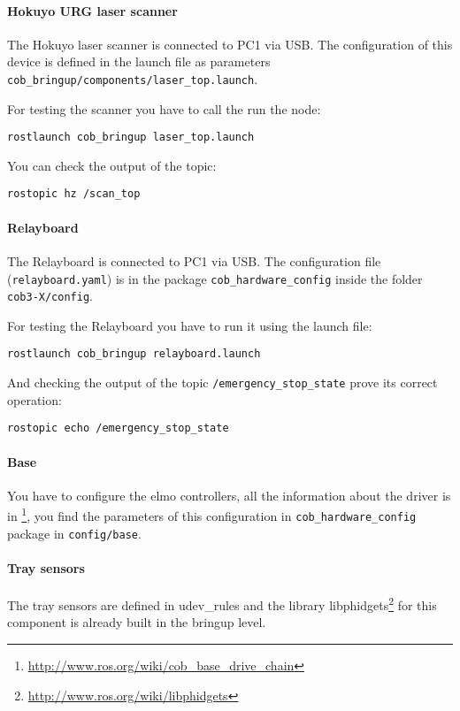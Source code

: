 \paragraph{Hokuyo URG laser scanner}
The Hokuyo laser scanner is connected to PC1 via USB. The configuration of this device is defined in the launch file as parameters \texttt{cob\_bringup/components/laser\_top.launch}.

For testing the scanner you have to call the run the node:
\begin{lstlisting}
rostlaunch cob_bringup laser_top.launch
\end{lstlisting}

You can check the output of the topic:
\begin{lstlisting}
rostopic hz /scan_top
\end{lstlisting}

\paragraph{Relayboard}
The Relayboard is connected to PC1 via USB. The configuration file (\texttt{relayboard.yaml}) is in the package \texttt{cob\_hardware\_config} inside the folder \texttt{cob3-X/config}.

For testing the Relayboard you have to run it using the launch file:
\begin{lstlisting}
rostlaunch cob_bringup relayboard.launch
\end{lstlisting}

And checking the output of the topic \texttt{/emergency\_stop\_state} prove its correct operation:
\begin{lstlisting}
rostopic echo /emergency_stop_state
\end{lstlisting}

\paragraph{Base}
You have to configure the elmo controllers, all the information about the driver is in \footnote{\url{http://www.ros.org/wiki/cob_base_drive_chain}}, you find the parameters of this configuration in \texttt{cob\_hardware\_config} package in \texttt{config/base}.

\paragraph{Tray sensors}
The tray sensors are defined in udev\_rules and the library libphidgets\footnote{\url{http://www.ros.org/wiki/libphidgets}} for this component is already built in the bringup level.

